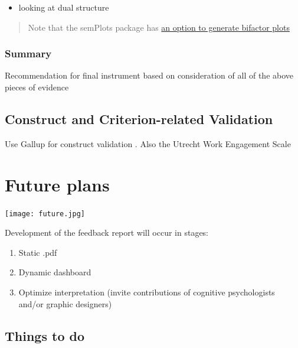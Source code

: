 \documentclass[
]{book}
\providecommand{\tightlist}{%
  \setlength{\itemsep}{0pt}\setlength{\parskip}{0pt}}
\begin{document}
\begin{itemize}
\tightlist
\item
  looking at dual structure
\end{itemize}

\begin{quote}
Note that the semPlots package has \href{https://www.rdocumentation.org/packages/semPlot/versions/1.1.2/topics/semPaths}{an option to generate bifactor plots}
\end{quote}

\hypertarget{summary}{%
\subsection{Summary}\label{summary}}

Recommendation for final instrument based on consideration of all of the above pieces of evidence

\hypertarget{construct-and-criterion-related-validation}{%
\section{Construct and Criterion-related Validation}\label{construct-and-criterion-related-validation}}

Use Gallup for construct validation \citep{thackray_gallup_2005, harter_relationship_2013}. Also the Utrecht Work Engagement Scale \citep[UWES;][]{schaufeli_measurement_2002, schaufeli_defining_2010}

\hypertarget{future-plans}{%
\chapter{Future plans}\label{future-plans}}

\texttt{[image: future.jpg]}

Development of the feedback report will occur in stages:

\begin{enumerate}
\def\labelenumi{\arabic{enumi}.}
\tightlist
\item
  Static .pdf
\item
  Dynamic dashboard
\item
  Optimize interpretation (invite contributions of cognitive psychologists and/or graphic designers)
\end{enumerate}

\hypertarget{things-to-do}{%
\section{Things to do}\label{things-to-do}}
\end{document}
